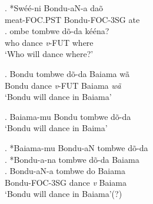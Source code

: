 \documentclass{assets/fieldnotes}
\begin{document}
\exg. *Swéé-ni Bondu-aN-a daõ\\
meat-FOC.PST Bondu-FOC-3SG ate\\

\exg. \textipa{\textltailn}ombe tombwe dõ-da kééna?\\
who dance \textit{v}-FUT where\\
`Who will dance where?'

\exg. Bondu tombwe dõ-da Baiama wã\\
Bondu dance \textit{v}-FUT Baiama \textit{wã}\\
`Bondu will dance in Baiama'

\exg. Baiama-mu Bondu tombwe dõ-da\\
`Bondu will dance in Baima'

\ex. *Baiama-mu Bondu-aN tombwe dõ-da\\

\ex. *Bondu-a-na tombwe dõ-da Baiama\\

\ex. Bondu-aN-a tombwe do Baiama\\
Bondu-FOC-3SG dance \textit{v} Baiama\\
`Bondu will dance in Baiama'(?)
\end{document}
